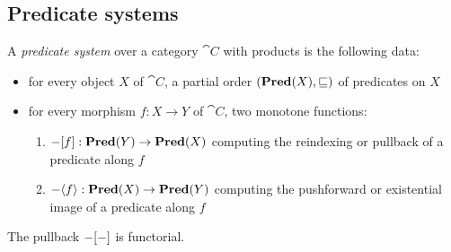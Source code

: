 \subsection{Predicate systems}
\label{sec:predicate-system}

A \emph{predicate system} over a category $\cat{C}$ with products is the following data:
\begin{itemize}
\item for every object $X$ of $\cat{C}$, a partial order $(\mathbf{Pred}(X), \sqsubseteq)$ of predicates on $X$
\item for every morphism $f: X \to Y$ of $\cat{C}$, two monotone functions:
   \begin{enumerate}
   \item $-[f]: \mathbf{Pred}(Y) \to \mathbf{Pred}(X)$ computing the reindexing or pullback of a predicate along $f$
   \item $-\langle f\rangle: \mathbf{Pred}(X) \to \mathbf{Pred}(Y)$ computing the pushforward or existential
   image of a predicate along $f$
   \end{enumerate}
\end{itemize}

The pullback $-[-]$ is functorial.

%
%
